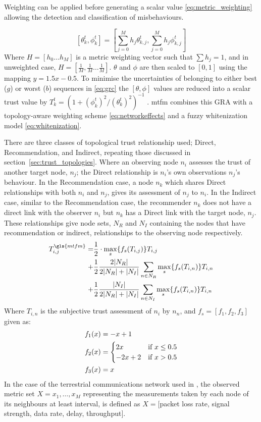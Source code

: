 Weighting can be applied before generating a scalar value \eqref{eq:metric_weighting} allowing the detection and classification of misbehaviours.

%
\begin{equation}
  \label{eq:metric_weighting}
  [\theta_k^t, \phi_k^t] = \left[\sum_{j=0}^M h_j \theta_{k,j}^t,\sum_{j=0}^M h_j \phi_{k,j}^t \right]
\end{equation}
%
Where $H=[h_0\dots h_M]$ is a metric weighting vector such that $\sum h_j = 1$, and in unweighted case, $H=[\frac{1}{M},\frac{1}{M}\dots\frac{1}{M}]$.
$\theta$ and $\phi$ are then scaled to $[0,1]$ using the mapping $y = 1.5 x - 0.5$.
To minimise the uncertainties of belonging to either best ($g$) or worst ($b$) sequences in \eqref{eq:grc} the $[\theta,\phi]$ values are reduced into a scalar trust value by $T_k^t = ({1+{(\phi_k^t)^2}/{(\theta_k^t)^2}})^{-1}$ \cite{Hong2010}.
\gls{mtfm} combines this GRA with a topology-aware weighting scheme \eqref{eq:networkeffects} and a fuzzy whitenization model \eqref{eq:whitenization}.

There are three classes of topological trust relationship used; Direct, Recommendation, and Indirect, repeating those discussed in section~\ref{sec:trust_topologies}.
Where an observing node $n_i$ assesses the trust of another target node, $n_j$; the Direct relationship is $n_i$'s own observations $n_j$'s behaviour.
In the Recommendation case, a node $n_k$ which shares Direct relationships with both $n_i$ and $n_j$, gives its assessment of $n_j$ to $n_i$.
In the Indirect case, similar to the Recommendation case, the recommender $n_k$ does not have a direct link with the observer $n_i$ but $n_k$ has a Direct link with the target node, $n_j$.
These relationships give node sets, $N_R$ and $N_I$ containing the nodes that have recommendation or indirect, relationships to the observing node respectively.
%
\begin{align}
  \label{eq:networkeffects}
  T_{i,j}^{\gls{mtfm}}=&\frac{1}{2} \cdot \max_s\{f_s(T_{i,j})\} T_{i,j}\\ \notag
  +&\frac{1}{2} \frac{2|N_R| }{2|N_R| + |N_I|}\sum_{n \in N_R} \max_s\{f_s(T_{i,n})\} T_{i,n}\\ \notag
  +&\frac{1}{2} \frac{|N_I| }{2|N_R| + |N_I|}\sum_{n \in N_I} \max_s\{f_s(T_{i,n})\} T_{i,n} 
\end{align}
Where $T_{i,n}$ is the subjective trust assessment of $n_i$ by $n_n$, and $f_s = [ f_1,f_2, f_3]$ given as:
\begin{align}
  \label{eq:whitenization}
  f_1(x)&= -x+1\notag\\
  f_2(x)&= 
  \begin{cases}
    2x & \text{if }x\leq 0.5\\
    -2x+2 & \text{if }x>0.5
  \end{cases}\\
  f_3(x)&= x\notag
\end{align}
%
In the case of the terrestrial communications network used in \cite{Guo11}, the observed metric set $X = {x_1,\dots,x_M}$ representing the measurements taken by each node of its neighbours at least interval, is defined as $X=[$packet loss rate, signal strength, data rate, delay, throughput$]$.

